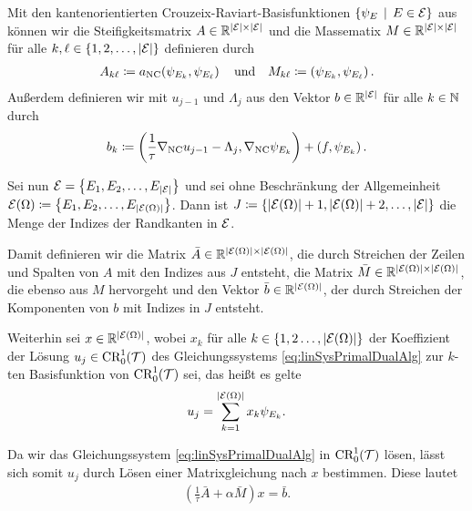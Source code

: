 \begin{remark} 
  \label{rem:primalDualMatrixEquations}
  Mit den kantenorientierten Crouzeix-Raviart-Basisfunktionen
  $\{\psi_E\,\mid\,E\in\mathcal{E}\}$ aus  können
  wir die Steifigkeitsmatrix $A\in\mathbb{R}^{|\mathcal{E}|\times|\mathcal{E}|}$ und die
  Massematix $M\in\mathbb{R}^{|\mathcal{E}|\times|\mathcal{E}|}$ für alle
  $k,\ell\in\{1,2,\ldots,|\mathcal{E}|\}$ definieren durch
  \begin{align*}
    A_{k\ell}\coloneqq a_\textup{NC}\!\left(\psi_{E_k},\psi_{E_\ell}\right)
    \quad\text{und}\quad
    M_{k\ell}\coloneqq \left(\psi_{E_k},\psi_{E_\ell}\right).
  \end{align*}
  Außerdem definieren wir mit $u_{j-1}$ und $\Lambda_j$ aus
   den Vektor $b\in\mathbb{R}^{|\mathcal{E}|}$ für alle
  $k\in\mathbb{N}$ durch
  \begin{align*}
    b_k\coloneqq 
    \left(\frac{1}{\tau}\nabla_\textup{NC} u_{j-1}-\Lambda_j,\nabla_\textup{NC}\psi_{E_k}\right)
    + \left( f,\psi_{E_k} \right).
  \end{align*}

  Sei nun $\mathcal{E}=\left\{E_1,E_2,\ldots,E_{|\mathcal{E}|}\right\}$ und sei ohne
  Beschränkung der Allgemeinheit 
  $\mathcal{E}(\Omega)\coloneqq\left\{E_1,E_2,\ldots,E_{|\mathcal{E}(\Omega)|}\right\}$.  
  Dann ist $J\coloneqq\{|\mathcal{E}(\Omega)|+1,|\mathcal{E}(\Omega)|+2,\ldots,|\mathcal{E}|\}$
  die Menge der Indizes der Randkanten in $\mathcal{E}$.

  Damit definieren wir die Matrix $\bar
  A\in\mathbb{R}^{|\mathcal{E}(\Omega)|\times|\mathcal{E}(\Omega)|}$, die durch Streichen der
  Zeilen und Spalten von $A$ mit den Indizes aus $J$ entsteht, die Matrix $\bar
  M\in\mathbb{R}^{|\mathcal{E}(\Omega)|\times|\mathcal{E}(\Omega)|}$, die ebenso aus $M$
  hervorgeht und den Vektor $\bar b\in\mathbb{R}^{|\mathcal{E}(\Omega)|}$, der durch
  Streichen der Komponenten von $b$ mit Indizes in $J$ entsteht.

  Weiterhin sei $x\in\mathbb{R}^{|\mathcal{E}(\Omega)|}$, wobei $x_k$ für alle
  $k\in\{1,2\ldots,|\mathcal{E}(\Omega)|\}$ der Koeffizient der Lösung 
  $u_j\in\textup{CR}^1_0(\mathcal{T})$ des
  Gleichungssystems \eqref{eq:linSysPrimalDualAlg} zur $k$-ten Basisfunktion
  von $\textup{CR}^1_0(\mathcal{T})$ sei, das heißt es gelte
  \begin{align*}
    u_j=\sum_{k=1}^{|\mathcal{E}(\Omega)|} x_k\psi_{E_k}.
  \end{align*}

  Da wir das Gleichungssystem \eqref{eq:linSysPrimalDualAlg} in
  $\textup{CR}^1_0(\mathcal{T})$ lösen, lässt sich somit $u_j$ durch Lösen einer
  Matrixgleichung nach $x$ bestimmen. 
  Diese lautet
  \begin{align}
    \label{eq:linSysPrimalDualAlgMatrixEq}
    \left(\frac{1}{\tau}\bar A+\alpha \bar M\right)x=\bar b.
  \end{align}
\end{remark}

